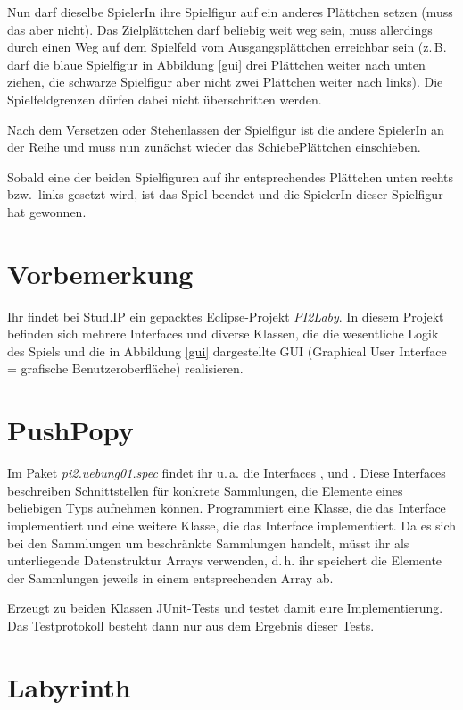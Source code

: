\documentclass{pi-aufgabenblatt}
\newcommand{\zB}{\mbox{z.\,B.}\xspace}
\newcommand{\uA}{\mbox{u.\,a.}\xspace}
\newcommand{\dH}{\mbox{d.\,h.}\xspace}
\begin{document}
Nun darf dieselbe SpielerIn ihre Spielfigur auf ein anderes Plättchen setzen (muss das aber nicht). 
Das Zielplättchen darf beliebig weit weg sein, muss allerdings durch einen Weg auf dem Spielfeld vom Ausgangsplättchen 
erreichbar sein (\zB darf die blaue Spielfigur in Abbildung \ref{gui} drei Plättchen weiter nach unten ziehen, die 
schwarze Spielfigur aber nicht zwei Plättchen weiter nach links). Die Spielfeldgrenzen dürfen dabei nicht überschritten 
werden. 

Nach dem Versetzen oder Stehenlassen der Spielfigur ist die andere SpielerIn an der Reihe und muss nun zunächst wieder 
das SchiebePlättchen einschieben.

Sobald eine der beiden Spielfiguren auf ihr entsprechendes Plättchen unten rechts bzw.\ links gesetzt wird, ist das 
Spiel beendet und die SpielerIn dieser Spielfigur hat gewonnen.

\section*{Vorbemerkung}
Ihr findet bei Stud.IP ein gepacktes Eclipse-Projekt \textit{PI2Laby}. In diesem Projekt befinden sich 
mehrere Interfaces und diverse Klassen, die die wesentliche Logik des Spiels und die in Abbildung \ref{gui} 
dargestellte GUI (Graphical User Interface = grafische Benutzeroberfläche) realisieren. 

\section{PushPopy }
Im Paket \textit{pi2.uebung01.spec} findet ihr \uA die Interfaces ,  und . Diese 
Interfaces beschreiben Schnittstellen für konkrete Sammlungen, die Elemente eines beliebigen Typs aufnehmen können. 
Programmiert eine Klasse, die das Interface  implementiert und eine weitere Klasse, die das 
Interface  implementiert. Da es sich bei den Sammlungen um beschränkte Sammlungen handelt, müsst ihr als 
unterliegende Datenstruktur Arrays verwenden, \dH ihr speichert die Elemente der Sammlungen jeweils in einem 
entsprechenden Array ab.

Erzeugt zu beiden Klassen JUnit-Tests und testet damit eure Implementierung. Das Testprotokoll besteht dann nur aus dem 
Ergebnis dieser Tests.

\section{Labyrinth }
\end{document}
